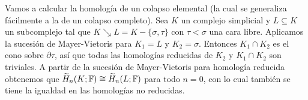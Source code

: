 \documentclass[HS.tex]{subfiles}
\begin{document}
\begin{ej}
Vamos a calcular la homología de un colapso elemental (la cual se generaliza fácilmente a la de un colapso completo). Sea $K$ un complejo simplicial y $L\subseteq K$ un subcomplejo tal que $K\searrow L=K-\{\sigma,\tau\}$ con $\tau<\sigma$ una cara libre. Aplicamos la sucesión de Mayer-Vietoris para $K_1=L$ y $K_2=\sigma$. Entonces $K_1\cap K_2$ es el cono sobre $\partial\tau$, así que todas las homologías reducidas de $K_2$ y $K_1\cap K_2$ son triviales. A partir de la sucesión de Mayer-Vietoris para homología reducida obtenemos que $\widetilde{H}_n(K;\mathbb{F})\cong \widetilde{H}_n(L;\mathbb{F})$ para todo $n=0$, con lo cual también se tiene la igualdad en las homologías no reducidas. 
\end{ej}
\end{document}
